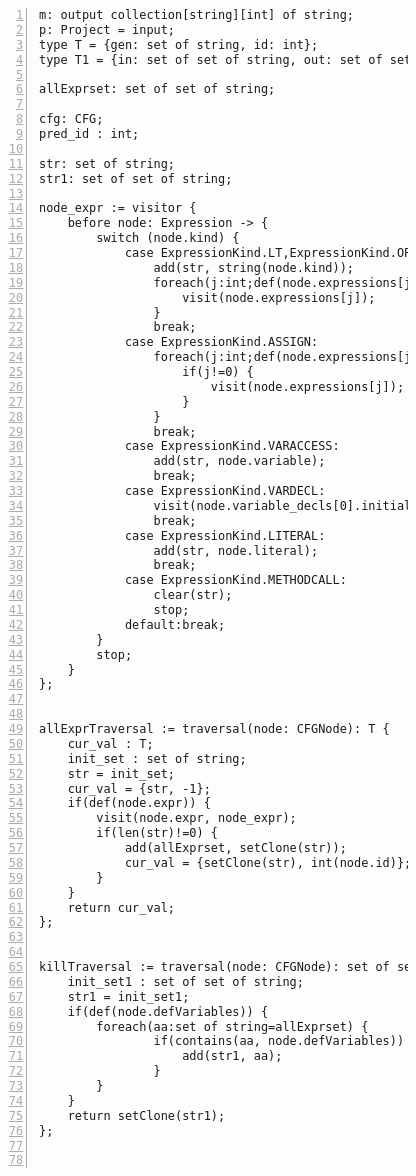 \begin{figure}[ht!]
\begin{lstlisting}[numbers=left, tabsize=4, escapechar=@, caption={Common subexpression detection},label={lst:csd-code}, lastline = 45] 
m: output collection[string][int] of string;
p: Project = input;
type T = {gen: set of string, id: int};
type T1 = {in: set of set of string, out: set of set of string, id : int};

allExprset: set of set of string;

cfg: CFG;
pred_id : int;

str: set of string;
str1: set of set of string;

node_expr := visitor {
	before node: Expression -> {
		switch (node.kind) {
			case ExpressionKind.LT,ExpressionKind.OP_ADD, ExpressionKind.OP_SUB, ExpressionKind.OP_INC, ExpressionKind.OP_MULT, ExpressionKind.OP_DIV, ExpressionKind.OP_MOD, ExpressionKind.OP_DEC, ExpressionKind.GT, ExpressionKind.EQ, ExpressionKind.NEQ, ExpressionKind.LTEQ, ExpressionKind.GTEQ, ExpressionKind.LOGICAL_NOT, ExpressionKind.LOGICAL_AND, ExpressionKind.LOGICAL_OR, ExpressionKind.BIT_AND, ExpressionKind.BIT_OR, ExpressionKind.BIT_NOT, ExpressionKind.BIT_XOR, ExpressionKind.BIT_LSHIFT, ExpressionKind.BIT_RSHIFT, ExpressionKind.BIT_UNSIGNEDRSHIFT:
				add(str, string(node.kind)); 
				foreach(j:int;def(node.expressions[j])) {
					visit(node.expressions[j]);
				}
				break;
			case ExpressionKind.ASSIGN:
				foreach(j:int;def(node.expressions[j])) {
					if(j!=0) {
						visit(node.expressions[j]);
					}
				}
				break;
			case ExpressionKind.VARACCESS:
				add(str, node.variable);
				break;
			case ExpressionKind.VARDECL:
				visit(node.variable_decls[0].initializer);
				break;
			case ExpressionKind.LITERAL:
				add(str, node.literal);
				break;
			case ExpressionKind.METHODCALL:
				clear(str);
				stop;
			default:break;
		}
		stop;
	}
};


allExprTraversal := traversal(node: CFGNode): T {
	cur_val : T;
	init_set : set of string;
	str = init_set;
	cur_val = {str, -1};
	if(def(node.expr)) {
		visit(node.expr, node_expr);
		if(len(str)!=0) {
			add(allExprset, setClone(str));
			cur_val = {setClone(str), int(node.id)};
		}
	}
	return cur_val;
};


killTraversal := traversal(node: CFGNode): set of set of string {
	init_set1 : set of set of string;
	str1 = init_set1;
	if(def(node.defVariables)) {
		foreach(aa:set of string=allExprset) {
				if(contains(aa, node.defVariables)) {
					add(str1, aa);
				}
		}
	}
	return setClone(str1);
};



\end{lstlisting}
\end{figure}
